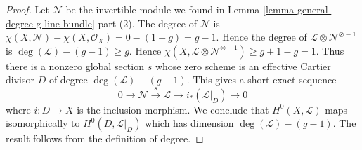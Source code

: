 \begin{proof}
Let $\mathcal{N}$ be the invertible module we found in
Lemma \ref{lemma-general-degree-g-line-bundle} part (2).
The degree of $\mathcal{N}$ is
$\chi(X, \mathcal{N}) - \chi(X, \mathcal{O}_X) = 0 - (1 - g) = g - 1$.
Hence the degree of $\mathcal{L} \otimes \mathcal{N}^{\otimes - 1}$
is $\deg(\mathcal{L}) - (g - 1) \geq g$.
Hence
$\chi(X, \mathcal{L} \otimes \mathcal{N}^{\otimes -1}) \geq g + 1 - g = 1$.
Thus there is a nonzero global section $s$ whose zero scheme is an
effective Cartier divisor $D$ of degree $\deg(\mathcal{L}) - (g - 1)$.
This gives a short exact sequence
$$
0 \to \mathcal{N} \xrightarrow{s} \mathcal{L} \to i_*(\mathcal{L}|_D) \to 0
$$
where $i : D \to X$ is the inclusion morphism. We conclude that
$H^0(X, \mathcal{L})$ maps isomorphically to $H^0(D, \mathcal{L}|_D)$
which has dimension $\deg(\mathcal{L}) - (g - 1)$. The result follows
from the definition of degree.
\end{proof}






